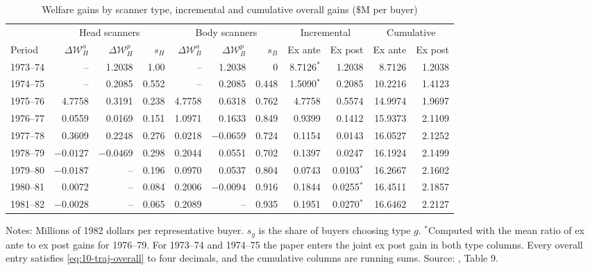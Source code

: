 \begin{table}[htbp]
\centering
\caption{Welfare gains by scanner type, incremental and cumulative overall gains (\$M per buyer)}
\label{tab:10-ct-gains}
\footnotesize
\setlength{\tabcolsep}{3.6pt}
\begin{tabular}{@{}lrrrrrrrrrr@{}}
\toprule
& \multicolumn{3}{c}{Head scanners} & \multicolumn{3}{c}{Body scanners} & \multicolumn{2}{c}{Incremental} &
  \multicolumn{2}{c}{Cumulative} \\
\cmidrule(lr){2-4}\cmidrule(lr){5-7}\cmidrule(lr){8-9}\cmidrule(lr){10-11}
Period & $\Delta\mathcal{W}^a_H$ & $\Delta\mathcal{W}^p_H$ & $s_H$ & $\Delta\mathcal{W}^a_B$ &
  $\Delta\mathcal{W}^p_B$ & $s_B$ & Ex ante & Ex post & Ex ante & Ex post \\
\midrule
1973--74 & -- & 1.2038 & 1.00 & -- & 1.2038 & 0 & 8.7126$^*$ & 1.2038 & 8.7126 & 1.2038 \\
1974--75 & -- & 0.2085 & 0.552 & -- & 0.2085 & 0.448 & 1.5090$^*$ & 0.2085 & 10.2216 & 1.4123 \\
1975--76 & 4.7758 & 0.3191 & 0.238 & 4.7758 & 0.6318 & 0.762 & 4.7758 & 0.5574 & 14.9974 & 1.9697 \\
1976--77 & 0.0559 & 0.0169 & 0.151 & 1.0971 & 0.1633 & 0.849 & 0.9399 & 0.1412 & 15.9373 & 2.1109 \\
1977--78 & 0.3609 & 0.2248 & 0.276 & 0.0218 & $-0.0659$ & 0.724 & 0.1154 & 0.0143 & 16.0527 & 2.1252 \\
1978--79 & $-0.0127$ & $-0.0469$ & 0.298 & 0.2044 & 0.0551 & 0.702 & 0.1397 & 0.0247 & 16.1924 & 2.1499 \\
1979--80 & $-0.0187$ & -- & 0.196 & 0.0970 & 0.0537 & 0.804 & 0.0743 & 0.0103$^*$ & 16.2667 & 2.1602 \\
1980--81 & 0.0072 & -- & 0.084 & 0.2006 & $-0.0094$ & 0.916 & 0.1844 & 0.0255$^*$ & 16.4511 & 2.1857 \\
1981--82 & $-0.0028$ & -- & 0.065 & 0.2089 & -- & 0.935 & 0.1951 & 0.0270$^*$ & 16.6462 & 2.2127 \\
\bottomrule
\end{tabular}

\smallskip
\begin{minipage}{0.96\linewidth}
\footnotesize Notes: Millions of 1982 dollars per representative buyer. $s_g$ is the share of buyers choosing type
$g$. $^*$Computed with the mean ratio of ex ante to ex post gains for 1976--79. For 1973--74 and 1974--75 the paper
enters the joint ex post gain in both type columns. Every overall entry satisfies \eqref{eq:10-traj-overall}
to four decimals, and the cumulative columns are running sums. Source: \citet{Trajtenberg1985}, Table 9.
\end{minipage}
\end{table}

